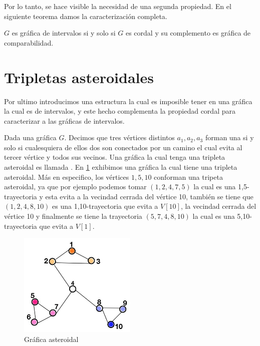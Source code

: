 Por lo tanto, se hace visible la necesidad de una segunda propiedad. En el siguiente teorema damos la caracterización completa.

\begin{teorema}
\label{teo:Crctzn1}
    $G$ es gráfica de intervalos si y solo si $G$ es cordal y su complemento es gráfica de comparabilidad.
\end{teorema}

\section{Tripletas asteroidales}
\label{sec:AstTrpls}
Por ultimo introducimos una estructura la cual es imposible tener en una gráfica la cual es de intervalos, y este hecho complementa la propiedad cordal para caracterizar a las gráficas de intervalos.

Dada una gráfica $G$. Decimos que tres vértices distintos $a_1,a_2,a_3$ forman una  si y solo si cualesquiera de ellos dos son conectados por un camino el cual evita al tercer vértice y todos sus vecinos. Una gráfica la cual tenga una tripleta asteroidal es llamada . En \cref{fig:GrafAstrdl} exhibimos una gráfica la cual tiene una tripleta asteroidal. Más en especifico, los vértices $1,5,10$ conforman una tripeta asteroidal, ya que por ejemplo podemos tomar $(1,2,4,7,5)$ la cual es una 1,5-trayectoria y esta evita a la vecindad cerrada del vértice 10, también se tiene que $(1,2,4,8,10)$ es una 1,10-trayectoria que evita a $V[10]$, la vecindad cerrada del vértice 10 y finalmente se tiene la trayectoria $(5,7,4,8,10)$ la cual es una 5,10-trayectoria que evita a $V[1]$.

\begin{figure}[H]
  \centering
  \includegraphics[width=0.5\textwidth]{recursos/capturas/Ast-Trpl.jpg}
  \caption{Gráfica asteroidal}
  \label{fig:GrafAstrdl}
\end{figure}

